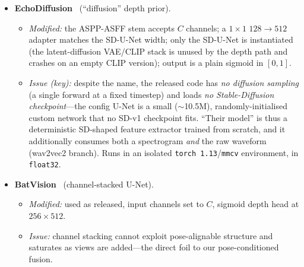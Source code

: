 \begin{itemize}
\item \textbf{EchoDiffusion}~\cite{zhang2024echodiffusion} (``diffusion'' depth prior).
  \begin{itemize}
    \item \emph{Modified:} the ASPP-ASFF stem accepts $C$ channels; a $1{\times}1$
      $128{\to}512$ adapter matches the SD-U-Net width; only the SD-U-Net is
      instantiated (the latent-diffusion VAE/CLIP stack is unused by the depth path
      and crashes on an empty CLIP version); output is a plain sigmoid in $[0,1]$.
    \item \emph{Issue (key):} despite the name, the released code has \emph{no
      diffusion sampling} (a single forward at a fixed timestep) and loads \emph{no
      Stable-Diffusion checkpoint}---the config U-Net is a small ($\sim$10.5M),
      randomly-initialised custom network that no SD-v1 checkpoint fits. ``Their
      model'' is thus a deterministic SD-shaped feature extractor trained from
      scratch, and it additionally consumes both a spectrogram \emph{and} the raw
      waveform (wav2vec2 branch). Runs in an isolated \texttt{torch~1.13}/\texttt{mmcv}
      environment, in \texttt{float32}.
  \end{itemize}

\item \textbf{BatVision}~\cite{brunetto2023batvision} (channel-stacked U-Net).
  \begin{itemize}
    \item \emph{Modified:} used as released, input channels set to $C$, sigmoid depth
      head at $256\times512$.
    \item \emph{Issue:} channel stacking cannot exploit pose-alignable structure and
      saturates as views are added---the direct foil to our pose-conditioned fusion.
  \end{itemize}
\end{itemize}

